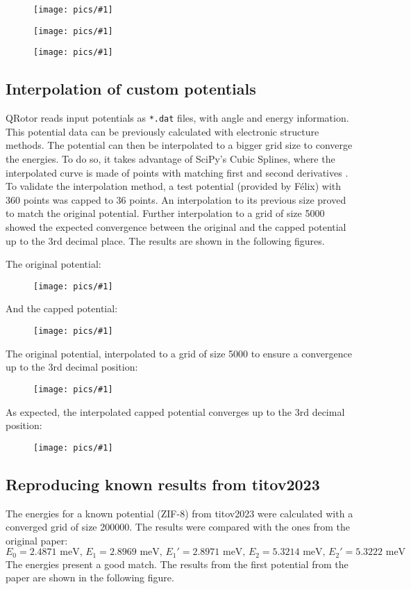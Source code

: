 \documentclass[12pt,a4paper]{article}
\newcommand{\NEWPICC}[2]{
\begin{figure}[H]
    \centering
    \texttt{[image: pics/\#1]}
    \label{#1}
    \end{figure}
    }
\begin{document}
\NEWPICC{titov2023_2.png}{1}
\NEWPICC{titov2023_op_2.png}{1}

\NEWPICC{convergence_E2_00004.png}{1}


\subsection{Interpolation of custom potentials}


QRotor reads input potentials as \texttt{*.dat} files, with angle and energy information.
This potential data can be previously calculated with electronic structure methods. The potential can then be interpolated to a bigger grid size to converge the energies. To do so, it takes advantage of SciPy's Cubic Splines, where the interpolated curve is made of points with matching first and second derivatives \cite{cubicsplines}.\\

To validate the interpolation method, a test potential (provided by Félix) with 360 points was capped to 36 points. An interpolation to its previous size proved to match the original potential. Further interpolation to a grid of size 5000 showed the expected convergence between the original and the capped potential up to the 3rd decimal place. The results are shown in the following figures.

\newpage

The original potential:
\NEWPICC{interpolate_potential_360.png}{1}
And the capped potential:
\NEWPICC{interpolate_potential_36.png}{1}

\newpage

The original potential, interpolated to a grid of size 5000 to ensure a convergence up to the 3rd decimal position:
\NEWPICC{interpolate_potential_5000.png}{1}
As expected, the interpolated capped potential converges up to the 3rd decimal position:
\NEWPICC{interpolate_potential_5000-from-36.png}{1}


\subsection{Reproducing known results from titov2023}


The energies for a known potential (ZIF-8) from titov2023 \cite{titov2023} were calculated with a converged grid of size 200000. The results were compared with the ones from the original paper:
$$
E_0=2.4871 \text{ meV, } E_1=2.8969 \text{ meV, } E_1'=2.8971 \text{ meV, } E_2=5.3214 \text{ meV, } E_2'=5.3222 \text{ meV}
$$
The energies present a good match. The results from the first potential from the paper are shown in the following figure.
\end{document}
